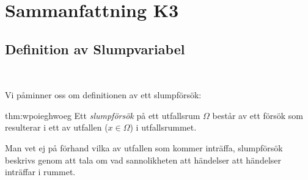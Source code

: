 \section{Sammanfattning K3}\par
\subsection{Definition av Slumpvariabel}\hfill\\\par
\noindent Vi påminner oss om definitionen av ett slumpförsök:
\par\bigskip
\begin{theo}[Slumpförsök]{thm:wpoieghwoeg}
  Ett \textit{slumpförsök} på ett utfallsrum $\Omega$ består av ett försök som resulterar i ett av utfallen ($x\in\Omega$) i utfallsrummet.\par\bigskip
  \noindent Man vet ej på förhand vilka av utfallen som kommer inträffa, slumpförsök beskrivs genom att tala om vad sannolikheten att händelser att händelser inträffar i rummet. 
\end{theo}
\par\bigskip
\noindent
